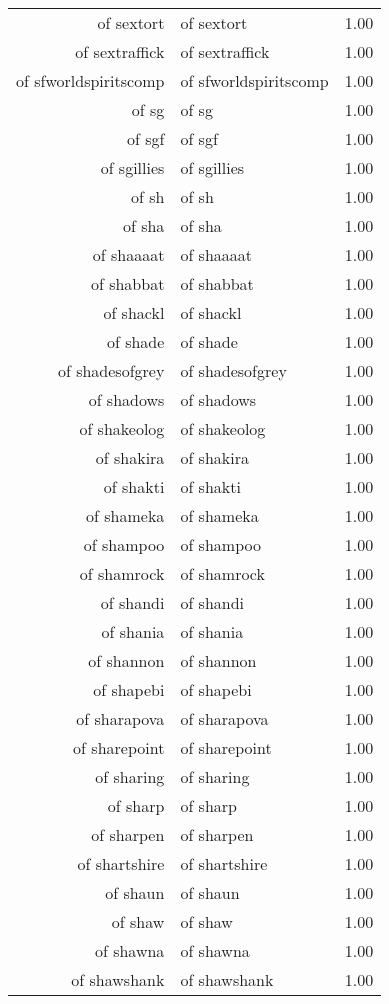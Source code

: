 \begin{table}[ht]
\begin{tabular}{rlr}
  of sextort & of sextort & 1.00 \\ 
  of sextraffick & of sextraffick & 1.00 \\ 
  of sfworldspiritscomp & of sfworldspiritscomp & 1.00 \\ 
  of sg & of sg & 1.00 \\ 
  of sgf & of sgf & 1.00 \\ 
  of sgillies & of sgillies & 1.00 \\ 
  of sh & of sh & 1.00 \\ 
  of sha & of sha & 1.00 \\ 
  of shaaaat & of shaaaat & 1.00 \\ 
  of shabbat & of shabbat & 1.00 \\ 
  of shackl & of shackl & 1.00 \\ 
  of shade & of shade & 1.00 \\ 
  of shadesofgrey & of shadesofgrey & 1.00 \\ 
  of shadows & of shadows & 1.00 \\ 
  of shakeolog & of shakeolog & 1.00 \\ 
  of shakira & of shakira & 1.00 \\ 
  of shakti & of shakti & 1.00 \\ 
  of shameka & of shameka & 1.00 \\ 
  of shampoo & of shampoo & 1.00 \\ 
  of shamrock & of shamrock & 1.00 \\ 
  of shandi & of shandi & 1.00 \\ 
  of shania & of shania & 1.00 \\ 
  of shannon & of shannon & 1.00 \\ 
  of shapebi & of shapebi & 1.00 \\ 
  of sharapova & of sharapova & 1.00 \\ 
  of sharepoint & of sharepoint & 1.00 \\ 
  of sharing & of sharing & 1.00 \\ 
  of sharp & of sharp & 1.00 \\ 
  of sharpen & of sharpen & 1.00 \\ 
  of shartshire & of shartshire & 1.00 \\ 
  of shaun & of shaun & 1.00 \\ 
  of shaw & of shaw & 1.00 \\ 
  of shawna & of shawna & 1.00 \\ 
  of shawshank & of shawshank & 1.00 \\ 

\end{tabular}
\end{table}
